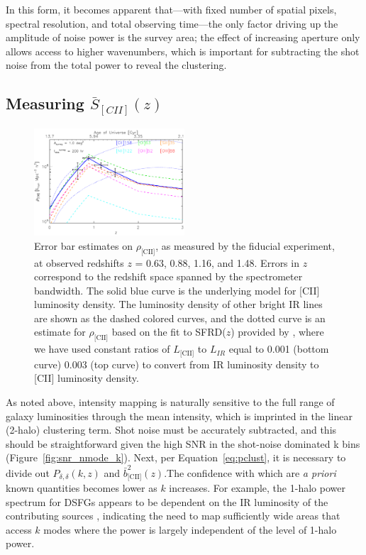 \documentclass[iop]{emulateapj}
\begin{document}
In this form, it becomes apparent that---with fixed number of spatial pixels, spectral resolution, and total observing time---the only factor driving up the amplitude of noise power is the survey area; the effect of increasing aperture only allows access to higher wavenumbers, which is important for subtracting the shot noise from the total power to reveal the clustering.

\subsection{Measuring $\bar{S}_{[CII]}(z)$}

\begin{figure}[b]
\centering
\includegraphics[width=0.5\textwidth]{rhocii_vs_z_starfire_1sqdeg_tobs200hr_hb}
\caption{Error bar estimates on $\rho_{\textrm{[CII]}}$, as measured by the fiducial experiment, at observed redshifts $z$ = 0.63, 0.88, 1.16, and 1.48. Errors in $z$ correspond to the redshift space spanned by the spectrometer bandwidth. The solid blue curve is the underlying model for [CII] luminosity density. The luminosity density of other bright IR lines are shown as the dashed colored curves, and the dotted curve is an estimate for $\rho_{\textrm{[CII]}}$ based on the fit to SFRD($z$) provided by \citet{hb06}, where we have used constant ratios of $L_{\textrm{[CII]}}$ to $L_{IR}$ equal to 0.001 (bottom curve) 0.003 (top curve) to convert from IR luminosity density to [CII] luminosity density.}
\label{fig:scii_z}
\end{figure}

As noted above, intensity mapping is naturally sensitive to the full range of galaxy luminosities through the mean intensity, which is imprinted in the linear (2-halo) clustering term. Shot noise must be accurately subtracted, and this should be straightforward given the high SNR in the shot-noise dominated k bins (Figure~\ref{fig:snr_nmode_k}).  Next, per Equation~\ref{eq:pclust}, it is necessary to divide out $P_{\delta,\delta}(k,z)$ and  $\bar{b}_{\textrm{[CII]}}^2(z)$.The confidence with which are \emph{a priori} known quantities becomes lower as $k$ increases. For example, the 1-halo power spectrum for DSFGs appears to be dependent on the IR luminosity of the contributing sources \citep{viero13}, indicating the need to map sufficiently wide areas that access $k$ modes where the power is largely independent of the level of 1-halo power. 
\end{document}
